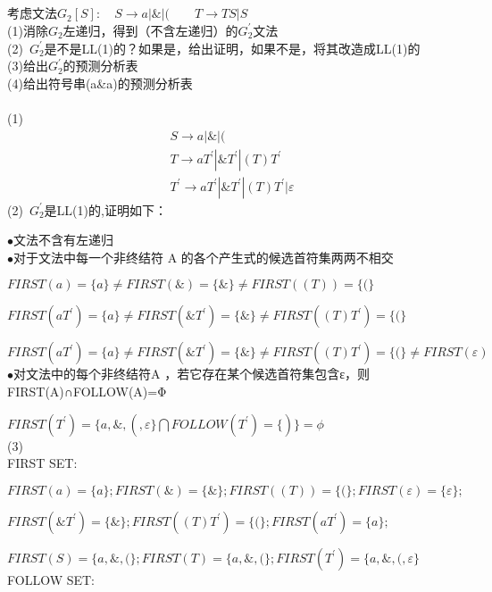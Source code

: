 \documentclass{article}
\title{
\vspace{2in}
\Huge{\textbf{\hmwkTitle}}\\
\vspace{2.5in}
}
\author{\textbf{\hmwkAuthorName}}
\date{\hmwkClassTime}
\begin{document}
\maketitle
\newpage
\noindent
考虑文法$G_{2}[S]:\quad S \rightarrow a|\&|(  \qquad T \rightarrow TS|S $\\
(1)消除$G_2$左递归，得到（不含左递归）的$G_2^{'}$文法\\
(2)\ $G_2^{'}$是不是LL(1)的？如果是，给出证明，如果不是，将其改造成LL(1)的\\
(3)给出$G_2^{'}$的预测分析表\\
(4)给出符号串(a\&a)的预测分析表\\ \\
\noindent
(1)
\begin{gather}
    S \rightarrow a|\&|( \\
    T \rightarrow aT^{'}|\&T^{'}|(T)T^{'}\\
    T^{'} \rightarrow aT^{'}|\&T^{'}|(T)T^{'}|\varepsilon
\end{gather}
(2)\ $G_2^{'}$是LL(1)的,证明如下：

$\bullet $文法不含有左递归\\

$\bullet $对于文法中每一个非终结符 A 的各个产生式的候选首符集两两不相交

$FIRST(a)=\{a\}\neq FIRST(\&)=\{\&\}\neq FIRST((T))=\{(\}$

$FIRST(aT^{'})=\{a\}\neq FIRST(\&T^{'})=\{\&\}\neq FIRST((T)T^{'})=\{(\}$

$FIRST(aT^{'})=\{a\}\neq FIRST(\&T^{'})=\{\&\}\neq FIRST((T)T^{'})=\{(\}\neq FIRST(\varepsilon)$\\

$\bullet $对文法中的每个非终结符A ，若它存在某个候选首符集包含ε，则FIRST(A)∩FOLLOW(A)=Φ

$FIRST(T^{'})=\{a,\&,(,\varepsilon\}\bigcap FOLLOW(T^{'})=\{)\}=\phi $\\
(3)\\
FIRST SET:

$FIRST(a)=\{a\};FIRST(\&)=\{\&\};FIRST((T))=\{(\};FIRST(\varepsilon)=\{\varepsilon \};$

$FIRST(\&T^{'})=\{\&\};FIRST((T)T^{'})=\{(\};FIRST(aT^{'})=\{a\};$

$FIRST(S)=\{a,\&,(\};FIRST(T)=\{a,\&,(\};FIRST(T^{'})=\{a,\&,(,\varepsilon \}$\\
FOLLOW SET:
\end{document}
